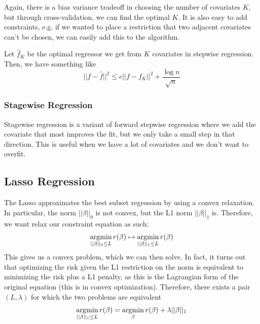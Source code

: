   Again, there is a bias variance tradeoff in choosing the number of covariates $K$, but through cross-validation, we can find the optimal $K$. It is also easy to add constraints, e.g. if we wanted to place a restriction that two adjacent covariates can't be chosen, we can easily add this to the algorithm. 

  \begin{theorem}
    Let $\hat{f}_K$ be the optimal regressor we get from $K$ covariates in stepwise regression. Then, we have something like
    \begin{equation}
      ||f - \hat{f}||^2 \leq c ||f - f_K||^2 + \frac{\log{n}}{\sqrt{n}}
    \end{equation}
  \end{theorem}

  \subsubsection{Stagewise Regression} 

    Stagewise regression is a variant of forward stepwise regression where we add the covariate that most improves the fit, but we only take a small step in that direction. This is useful when we have a lot of covariates and we don't want to overfit. 

\subsection{Lasso Regression}

  The Lasso approximates the best subset regression by using a convex relaxation. In particular, the norm $||\beta||_0$ is not convex, but the L1 norm $||\beta||_1$ is. Therefore, we want relax our constraint equation as such: 
  \begin{equation}
    \operatorname*{\arg\!\min}_{||\beta||_0 \leq L} r(\beta) \mapsto \operatorname*{\arg\!\min}_{||\beta||_1 \leq L} r(\beta)
  \end{equation}
  This gives us a convex problem, which we can then solve. In fact, it turns out that optimizing the risk given the L1 restriction on the norm is equivalent to minimizing the risk plus a L1 penalty, as this is the Lagrangian form of the original equation (this is in convex optimization). Therefore, there exists a pair $(L, \lambda)$ for which the two problems are equivalent 
  \begin{equation}
    \operatorname*{\arg\!\min}_{||\beta||_1 \leq L} r(\beta) = \operatorname*{\arg\!\min}_{\beta} r(\beta) + \lambda ||\beta||_1
  \end{equation}

